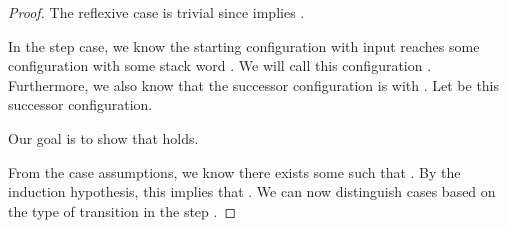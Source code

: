 \begin{isabellebody}
\begin{isamarkuptext}
\begin{lemma}
\begin{proof}
The reflexive case is trivial since  implies .

In the step case, we know the starting configuration with input  reaches some
configuration  with some stack word \isa{{\isasymalpha}}. We will call this configuration
. Furthermore, we also know that the successor configuration is
 with . Let  be
this successor configuration. 

Our goal is to show that  holds. 

From the case assumptions, we know there exists some  such that . By
the induction hypothesis, this implies that . We can now 
distinguish cases based on the type of transition in the step .


\end{proof}
\end{lemma}
\end{isamarkuptext}
\end{isabellebody}
